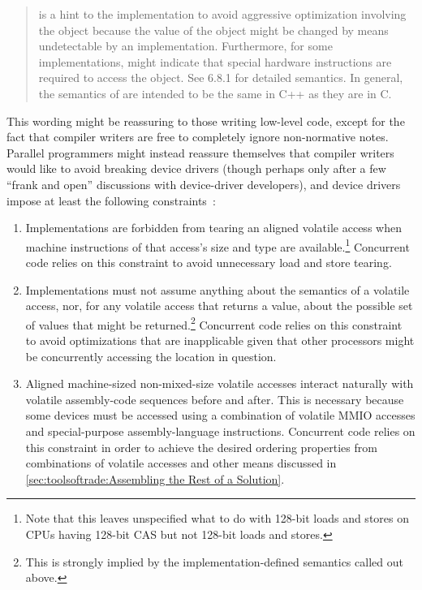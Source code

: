 \begin{quote}
	 is a hint to the implementation to avoid
	aggressive optimization involving the object because the value
	of the object might be changed by means undetectable by an
	implementation.
	Furthermore, for some implementations,  might indicate
	that special hardware instructions are required to access
	the object.
	See 6.8.1 for detailed semantics.
	In general, the semantics of  are intended to be the
	same in C++ as they are in C.
\end{quote}

This wording might be reassuring to those writing low-level code, except
for the fact that compiler writers are free to completely ignore
non-normative notes.
Parallel programmers might instead reassure themselves that compiler
writers would like to avoid breaking device drivers (though perhaps
only after a few ``frank and open'' discussions with device-driver
developers), and device drivers impose at least the following
constraints~\cite{PaulEMcKenney2016P0124R6-LKMM}:

\begin{enumerate}
\item	Implementations are forbidden from tearing an aligned volatile
	access when machine instructions of that access's size and type
	are available.\footnote{
		Note that this leaves unspecified what to do with 128-bit
		loads and stores on CPUs having 128-bit CAS but not
		128-bit loads and stores.}
	Concurrent code relies on this constraint to avoid unnecessary
	load and store tearing.
\item	Implementations must not assume anything about the semantics of
	a volatile access, nor, for any volatile access that returns a
	value, about the possible set of values that might be
	returned.\footnote{
		This is strongly implied by the implementation-defined
		semantics called out above.}
	Concurrent code relies on this constraint to avoid optimizations
	that are inapplicable given that other processors might be
	concurrently accessing the location in question.
\item	Aligned machine-sized non-mixed-size volatile accesses interact
	naturally with volatile assembly-code sequences before and after.
	This is necessary because some devices must be accessed using
	a combination of volatile MMIO accesses and special-purpose
	assembly-language instructions.
	Concurrent code relies on this constraint in order to achieve
	the desired ordering properties from combinations of volatile
	accesses and other means discussed in
	\cref{sec:toolsoftrade:Assembling the Rest of a Solution}.
\end{enumerate}

